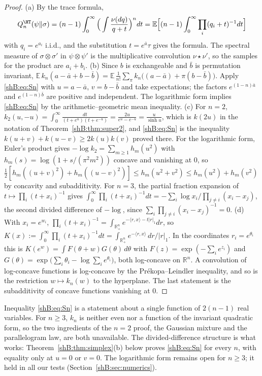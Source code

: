 \begin{proof}
(a) By the trace formula,
\[
Q^\HT_n(\psi\|\sigma)=(n-1)\int_0^\infty\Big(\int\frac{\nu(dq)}{q+t}\Big)^ndt=\mathbb E\Big[(n-1)\int_0^\infty\prod_i(q_i+t)^{-1}dt\Big]
\]
with $q_i=e^{a_i}$ i.i.d., and the substitution $t=e^{\bar a}\tau$ gives the formula. The spectral measure of $\sigma\otimes\sigma'$ in $\psi\otimes\psi'$ is the multiplicative convolution $\nu\star\nu'$, so the samples for the product are $a_i+b_i$.
(b) Since $b$ is exchangeable and $\bar b$ is permutation invariant, $\mathbb E\,k_n(a-\bar a+b-\bar b)=\mathbb E\,\frac1{n!}\sum_\pi k_n\big((a-\bar a)+\pi(b-\bar b)\big)$. Apply \eqref{shB:eq:Sn} with $u=a-\bar a$, $v=b-\bar b$ and take expectations; the factors $e^{(1-n)\bar a}$ and $e^{(1-n)\bar b}$ are positive and independent. The logarithmic form implies \eqref{shB:eq:Sn} by the arithmetic--geometric mean inequality.
(c) For $n=2$, $k_2(u,-u)=\int_0^\infty\frac{dt}{(t+e^u)(t+e^{-u})}=\frac{2u}{e^u-e^{-u}}=\frac{u}{\sinh u}$, which is $k(2u)$ in the notation of Theorem~\ref{shB:thm:super2}, and \eqref{shB:eq:Sn} is the inequality $k(u+v)+k(u-v)\ge2k(u)k(v)$ proved there. For the logarithmic form, Euler's product gives $-\log k_2=\sum_{m\ge1}h_m(u^2)$ with $h_m(s)=\log(1+s/(\pi^2m^2))$ concave and vanishing at $0$, so $\frac12[h_m((u+v)^2)+h_m((u-v)^2)]\le h_m(u^2+v^2)\le h_m(u^2)+h_m(v^2)$ by concavity and subadditivity. For $n=3$, the partial fraction expansion of $t\mapsto\prod_i(t+x_i)^{-1}$ gives $\int_0^\infty\prod_i(t+x_i)^{-1}dt=-\sum_i\log x_i\big/\prod_{j\ne i}(x_i-x_j)$, the second divided difference of $-\log$, since $\sum_i\prod_{j\ne i}(x_i-x_j)^{-1}=0$.
(d) With $x_i=e^{w_i}$, $\prod_i(t+x_i)^{-1}=\int_{\mathbb R_+^n}e^{-\langle r,x\rangle-t|r|_1}dr$, so $K(x):=\int_0^\infty\prod_i(t+x_i)^{-1}dt=\int_{\mathbb R_+^n}e^{-\langle r,x\rangle}\,dr/|r|_1$. In the coordinates $r_i=e^{\theta_i}$ this is $K(e^w)=\int F(\theta+w)G(\theta)\,d\theta$ with $F(z)=\exp(-\sum_ie^{z_i})$ and $G(\theta)=\exp\big(\sum_i\theta_i-\log\sum_ie^{\theta_i}\big)$, both log-concave on $\mathbb R^n$. A convolution of log-concave functions is log-concave by the Pr\'ekopa--Leindler inequality, and so is the restriction $w\mapsto k_n(w)$ to the hyperplane. The last statement is the subadditivity of concave functions vanishing at $0$.
\end{proof}

Inequality \eqref{shB:eq:Sn} is a statement about a single function of $2(n-1)$ real variables. For $n\ge3$, $k_n$ is neither even nor a function of the invariant quadratic form, so the two ingredients of the $n=2$ proof, the Gaussian mixture and the parallelogram law, are both unavailable. The divided-difference structure is what works: Theorem~\ref{shB:thm:simplex}(b) below proves \eqref{shB:eq:Sn} for every $n$, with equality only at $u=0$ or $v=0$. The logarithmic form remains open for $n\ge3$; it held in all our tests (Section~\ref{shB:sec:numerics}).

